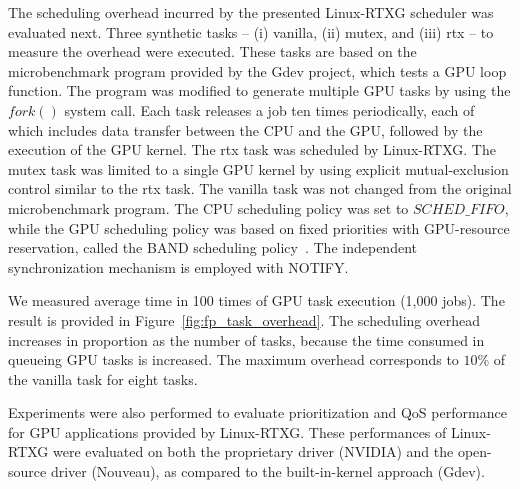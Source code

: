 The scheduling overhead incurred by the presented Linux-RTXG scheduler was evaluated next.
Three synthetic tasks -- (i) vanilla, (ii) mutex, and (iii) rtx -- to measure the overhead were executed.
These tasks are based on the microbenchmark program provided by the Gdev project, which tests a GPU loop function.
The program was modified to generate multiple GPU tasks by using the $fork()$ system call.
Each task releases a job ten times periodically, each of which includes data transfer between the CPU and the GPU, followed by the execution of the GPU kernel.
The rtx task was scheduled by Linux-RTXG.
The mutex task was limited to a single GPU kernel by using explicit mutual-exclusion control similar to the rtx task.
The vanilla task was not changed from the original microbenchmark program.
The CPU scheduling policy was set to $SCHED\_FIFO$, while the GPU scheduling policy was based on fixed priorities with GPU-resource reservation, called the BAND scheduling policy~\cite{kato:gdev}.
The independent synchronization mechanism is employed with NOTIFY.

We measured average time in 100 times of GPU task execution (1,000 jobs).
The result is provided in Figure~\ref{fig:fp_task_overhead}.
The scheduling overhead increases in proportion as the number of tasks, because the time consumed in queueing GPU tasks is increased.
The maximum overhead corresponds to $10\%$ of the vanilla task for eight tasks.

Experiments were also performed to evaluate prioritization and QoS performance for GPU applications provided by Linux-RTXG.
These performances of Linux-RTXG were evaluated on both the proprietary driver (NVIDIA) and the open-source driver (Nouveau), as compared to the built-in-kernel approach (Gdev).


